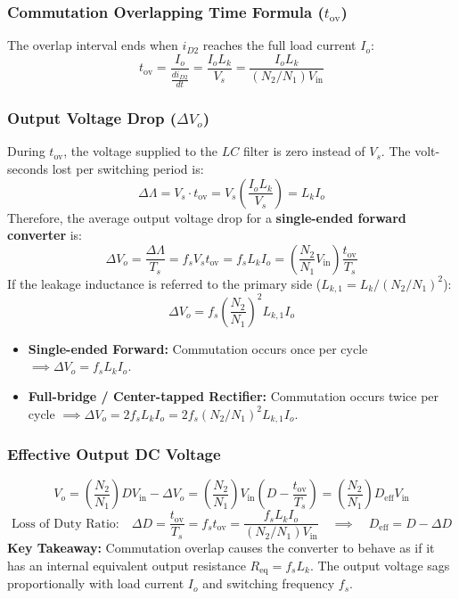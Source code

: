 \subsubsection{Commutation Overlapping Time Formula ($t_{\mathrm{ov}}$)}
The overlap interval ends when $i_{D2}$ reaches the full load current $I_o$:
\begin{equation}
t_{\mathrm{ov}} = \frac{I_o}{\frac{di_{D2}}{dt}} = \frac{I_o L_k}{V_s} = \frac{I_o L_k}{(N_2/N_1) V_{\mathrm{in}}}
\end{equation}

\subsubsection{Output Voltage Drop ($\Delta V_o$)}
During $t_{\mathrm{ov}}$, the voltage supplied to the $LC$ filter is zero instead of $V_s$. The volt-seconds lost per switching period is:
\[
\Delta \Lambda = V_s \cdot t_{\mathrm{ov}} = V_s \left(\frac{I_o L_k}{V_s}\right) = L_k I_o
\]
Therefore, the average output voltage drop for a \textbf{single-ended forward converter} is:
\begin{equation}
\Delta V_o = \frac{\Delta \Lambda}{T_s} = f_s V_s t_{\mathrm{ov}} = f_s L_k I_o = \left(\frac{N_2}{N_1} V_{\mathrm{in}}\right) \frac{t_{\mathrm{ov}}}{T_s}
\end{equation}
If the leakage inductance is referred to the primary side ($L_{k,1} = L_k / (N_2/N_1)^2$):
\begin{equation}
\Delta V_o = f_s \left(\frac{N_2}{N_1}\right)^2 L_{k,1} I_o
\end{equation}
\begin{itemize}
  \item \textbf{Single-ended Forward:} Commutation occurs once per cycle $\implies \Delta V_o = f_s L_k I_o$.
  \item \textbf{Full-bridge / Center-tapped Rectifier:} Commutation occurs twice per cycle $\implies \Delta V_o = 2 f_s L_k I_o = 2 f_s (N_2/N_1)^2 L_{k,1} I_o$.
\end{itemize}

\subsubsection{Effective Output DC Voltage}
\begin{equation}
V_o = \left(\frac{N_2}{N_1}\right) D V_{\mathrm{in}} - \Delta V_o = \left(\frac{N_2}{N_1}\right) V_{\mathrm{in}} \left(D - \frac{t_{\mathrm{ov}}}{T_s}\right) = \left(\frac{N_2}{N_1}\right) D_{\mathrm{eff}} V_{\mathrm{in}}
\end{equation}
\begin{equation}
\text{Loss of Duty Ratio:} \quad \Delta D = \frac{t_{\mathrm{ov}}}{T_s} = f_s t_{\mathrm{ov}} = \frac{f_s L_k I_o}{(N_2/N_1) V_{\mathrm{in}}} \quad\implies\quad D_{\mathrm{eff}} = D - \Delta D
\end{equation}
\noindent\textbf{Key Takeaway:} Commutation overlap causes the converter to behave as if it has an internal equivalent output resistance $R_{\mathrm{eq}} = f_s L_k$. The output voltage sags proportionally with load current $I_o$ and switching frequency $f_s$.


